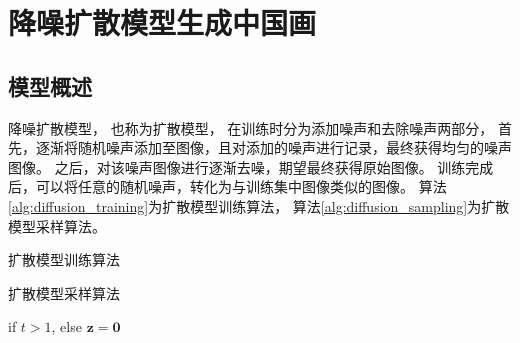 \chapter{降噪扩散模型生成中国画}

\section{模型概述}
降噪扩散模型，
也称为扩散模型，
在训练时分为添加噪声和去除噪声两部分，
首先，逐渐将随机噪声添加至图像，且对添加的噪声进行记录，最终获得均匀的噪声图像。
之后，对该噪声图像进行逐渐去噪，期望最终获得原始图像。
训练完成后，可以将任意的随机噪声，转化为与训练集中图像类似的图像。
算法{\ref{alg:diffusion_training}}为扩散模型训练算法，
算法{\ref{alg:diffusion_sampling}}为扩散模型采样算法。
\begin{algorithm}[ht]
    \caption{扩散模型训练算法}\label{alg:diffusion_training}
    \begin{algorithmic}[1]
        \REPEAT
    \end{algorithmic}
\end{algorithm}
\begin{algorithm}[ht]
    \caption{扩散模型采样算法}\label{alg:diffusion_sampling}
    \begin{algorithmic}[1]
          if {$t>1$}, else {$\bm{z}=\bm{0}$}
        \ENDFOR
    \end{algorithmic}
\end{algorithm}

